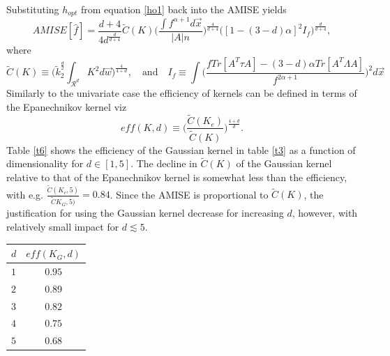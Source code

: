 Substituting $h_{opt}$ from equation \eqref{ho1} back into the AMISE yields
\begin{equation}
	AMISE[\hat{f}]= \frac{d+4}{4d^\frac{d}{d+4}}\tilde{C}(K)\bigg(\frac{\int f^{\alpha+1}d\vec{x} }{|A|n}\bigg)^\frac{4}{d+4}\bigg([1-(3-d)\alpha]^2I_f\bigg)^\frac{d}{d+4}
	,
	\label{misec3}
\end{equation}
where
\begin{equation}
	\tilde{C}(K)\equiv \bigg(\tilde{k}_2^\frac{d}{2}\int_{\mathcal{R}^d} K^2d\vec{w}\bigg)^{\frac{4}{4+d}}, \quad \text{and}\quad I_f\equiv\int \bigg(\frac{fTr[A^T\tau A]-(3-d)\alpha Tr[A^T\Lambda A]}{f^{2\alpha+1}}\bigg)^2d\vec{x}
	\label{cck}
\end{equation}
Similarly to the univariate case the efficiency of kernels can be defined in terms of the Epanechnikov kernel viz
\begin{equation}
	eff(K,d)\equiv \bigg(\frac{\tilde{C}(K_e)}{\tilde{C}(K)}\bigg)^\frac{4+d}{d}.
\end{equation}
Table \ref{t6} shows the efficiency of the Gaussian kernel in table \ref{t3} as a function of dimensionality for $d\in [1,5]$. The decline in $\tilde{C}(K)$ of the Gaussian kernel relative to that of the Epanechnikov kernel is somewhat less than the efficiency, with e.g. $\frac{\tilde{C}(K_e,5)}{\tilde{C}K_G,5)}=0.84$. Since the AMISE is proportional to $\tilde{C}(K)$, the justification for using the Gaussian kernel decrease for increasing $d$, however, with relatively small impact for $d\lesssim 5$. 
\begin{center}
	\begin{tabular}{ l|| c|}
		$d$ & $eff(K_G,d)$ \\
		\hline
		$1$ & $0.95$  \\
		$2$ & $0.89$ \\
		$3$ & $0.82$\\
		$4$ & $0.75$\\
		$5$ & $0.68$\\
	\end{tabular}
	\captionsetup{width=0.95\textwidth}
	\label{t6}
\end{center}

